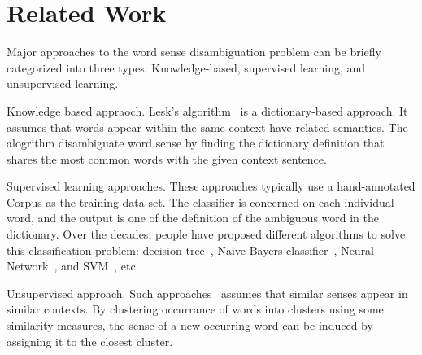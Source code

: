 \section{Related Work}

Major approaches to the word sense disambiguation problem can be briefly
categorized into three types: Knowledge-based, supervised learning, and
unsupervised learning. 

Knowledge based appraoch.
Lesk's algorithm~\cite{lesk1986automatic} is a
dictionary-based approach. It assumes that words appear within the same context
have related semantics. The alogrithm disambiguate word sense by finding the
dictionary definition that shares the most common words with the given context
sentence.

Supervised learning approaches. These approaches typically use a hand-annotated
Corpus as the training data set. The classifier is concerned on each individual
word, and the output is one of the definition of the ambiguous word in the
dictionary. Over the decades, people have proposed different algorithms to solve
this classification problem: decision-tree~\cite{quinlan1986induction}, 
Naive Bayers classifier~\cite{ng1997getting}, Neural
Network~\cite{cottrell1985connectionist}, and SVM~\cite{lee2002empirical}, etc.

Unsupervised approach. Such approaches~\cite{schutze1998automatic} assumes that
similar senses appear in similar contexts. By clustering occurrance of words
into clusters using some similarity measures, the sense of a new occurring word
can be induced by assigning it to the closest cluster.

